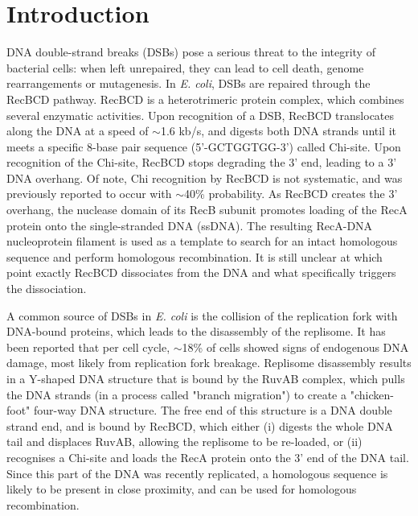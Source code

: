 \section*{Introduction}

DNA double-strand breaks (DSBs) pose a serious threat to the integrity of bacterial cells: when left unrepaired, they can lead to cell death, genome rearrangements or mutagenesis. In \emph{E. coli}, DSBs are repaired through the RecBCD pathway. RecBCD is a heterotrimeric protein complex, which combines several enzymatic activities\cite{Dillingham2008}. Upon recognition of a DSB, RecBCD translocates along the DNA at a speed of $\sim$1.6 kb/s\cite{Wiktor2018}, and digests both DNA strands until it meets a specific 8-base pair sequence (5'-GCTGGTGG-3') called Chi-site. Upon recognition of the Chi-site, RecBCD stops degrading the 3' end, leading to a 3' DNA overhang. Of note, Chi recognition by RecBCD is not systematic, and was previously reported to occur with $\sim$40\% probability\cite{Taylor1992,Cockram2015}. As RecBCD creates the 3' overhang, the nuclease domain of its RecB subunit promotes loading of the RecA protein onto the single-stranded DNA (ssDNA)\cite{Churchill2000, Spies2006}. The resulting RecA-DNA nucleoprotein filament is used as a template to search for an intact homologous sequence and perform homologous recombination. It is still unclear at which point exactly RecBCD dissociates from the DNA and what specifically triggers the dissociation.

A common source of DSBs in \emph{E. coli} is the collision of the replication fork with DNA-bound proteins, which leads to the disassembly of the replisome\cite{Michel1997}. It has been reported that per cell cycle, $\sim$18\% of cells showed signs of endogenous DNA damage, most likely from replication fork breakage\cite{Sinha2018}. Replisome disassembly results in a Y-shaped DNA structure that is bound by the RuvAB complex, which pulls the DNA strands (in a process called "branch migration") to create a "chicken-foot" four-way DNA structure\cite{Seigneur1998}. The free end of this structure is a DNA double strand end, and is bound by RecBCD, which either (i) digests the whole DNA tail and displaces RuvAB, allowing the replisome to be re-loaded, or (ii) recognises a Chi-site and loads the RecA protein onto the 3' end of the DNA tail\cite{Michel2001}. Since this part of the DNA was recently replicated, a homologous sequence is likely to be present in close proximity, and can be used for homologous recombination.

